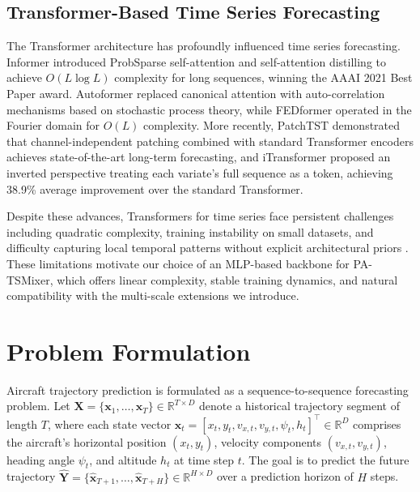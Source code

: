 \documentclass[letterpaper,journal]{IEEEtran}
\begin{document}
\subsection{Transformer-Based Time Series Forecasting}
The Transformer architecture \cite{Vaswani2017} has profoundly influenced time
series forecasting. Informer \cite{Zhou2021Informer} introduced ProbSparse
self-attention and self-attention distilling to achieve $O(L \log L)$ complexity
for long sequences, winning the AAAI 2021 Best Paper award. Autoformer
\cite{Wu2021Autoformer} replaced canonical attention with auto-correlation
mechanisms based on stochastic process theory, while FEDformer \cite{Zhou2022FEDformer}
operated in the Fourier domain for $O(L)$ complexity. More recently,
PatchTST \cite{Nie2023PatchTST} demonstrated that channel-independent patching
combined with standard Transformer encoders achieves state-of-the-art long-term
forecasting, and iTransformer \cite{Liu2024iTransformer} proposed an inverted
perspective treating each variate's full sequence as a token, achieving 38.9\%
average improvement over the standard Transformer.

Despite these advances, Transformers for time series face persistent challenges
including quadratic complexity, training instability on small datasets, and
difficulty capturing local temporal patterns without explicit architectural
priors \cite{Zeng2023DLinear}. These limitations motivate our choice of an
MLP-based backbone for PA-TSMixer, which offers linear complexity, stable
training dynamics, and natural compatibility with the multi-scale extensions
we introduce.


\section{Problem Formulation}
Aircraft trajectory prediction is formulated as a sequence-to-sequence forecasting
problem. Let $\mathbf{X} = \{\mathbf{x}_1, \ldots, \mathbf{x}_T\} \in \mathbb{R}^{T \times D}$
denote a historical trajectory segment of length $T$, where each state vector
$\mathbf{x}_t = [x_t, y_t, v_{x,t}, v_{y,t}, \psi_t, h_t]^\top \in \mathbb{R}^{D}$
comprises the aircraft's horizontal position $(x_t, y_t)$, velocity components
$(v_{x,t}, v_{y,t})$, heading angle $\psi_t$, and altitude $h_t$ at time step $t$.
The goal is to predict the future trajectory
$\hat{\mathbf{Y}} = \{\hat{\mathbf{x}}_{T+1}, \ldots, \hat{\mathbf{x}}_{T+H}\} \in \mathbb{R}^{H \times D}$
over a prediction horizon of $H$ steps.
\end{document}
